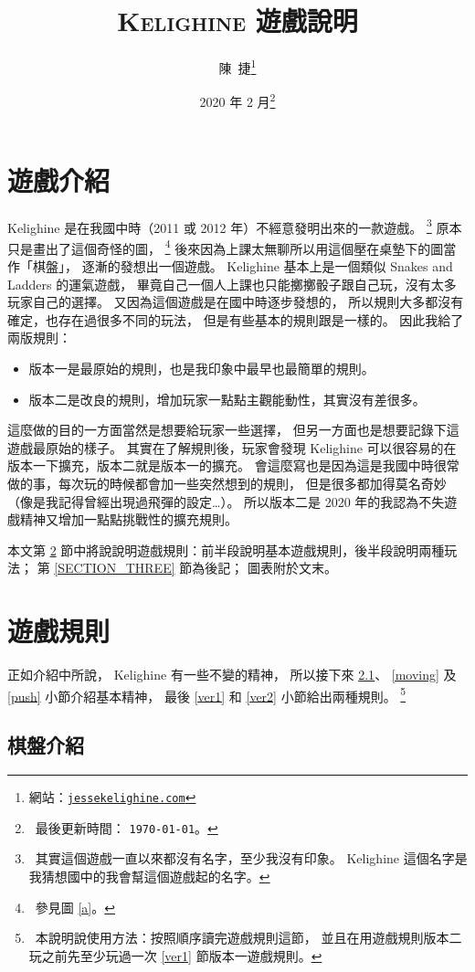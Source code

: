 \documentclass[11pt,a4paper]{article}
\title{\textsc{Kelighine} 遊戲說明}
\author{陳\ 捷\thanks{網站：\href{https://jessekelighine.com}{\texttt{jessekelighine.com}}}}
\date{2020 年 2 月\thanks{\ 最後更新時間： \texttt{\today}。}}
\begin{document}
\maketitle

\section{遊戲介紹} %

Kelighine 是在我國中時（2011 或 2012 年）不經意發明出來的一款遊戲。
	\footnote{\ 其實這個遊戲一直以來都沒有名字，至少我沒有印象。
	Kelighine 這個名字是我猜想國中的我會幫這個遊戲起的名字。}
原本只是畫出了這個奇怪的圖，
	\footnote{\ 參見圖 \ref{a}。}
後來因為上課太無聊所以用這個壓在桌墊下的圖當作「棋盤」，
逐漸的發想出一個遊戲。
Kelighine 基本上是一個類似 Snakes and Ladders 的運氣遊戲，
畢竟自己一個人上課也只能擲擲骰子跟自己玩，沒有太多玩家自己的選擇。
又因為這個遊戲是在國中時逐步發想的，
所以規則大多都沒有確定，也存在過很多不同的玩法，
但是有些基本的規則跟是一樣的。
因此我給了兩版規則：
\begin{itemize}
	\item 版本一是最原始的規則，也是我印象中最早也最簡單的規則。
	\item 版本二是改良的規則，增加玩家一點點主觀能動性，其實沒有差很多。
\end{itemize}
這麼做的目的一方面當然是想要給玩家一些選擇，
但另一方面也是想要記錄下這遊戲最原始的樣子。
其實在了解規則後，玩家會發現 Kelighine 可以很容易的在版本一下擴充，版本二就是版本一的擴充。
會這麼寫也是因為這是我國中時很常做的事，每次玩的時候都會加一些突然想到的規則，
但是很多都加得莫名奇妙（像是我記得曾經出現過飛彈的設定…）。
所以版本二是 2020 年的我認為不失遊戲精神又增加一點點挑戰性的擴充規則。

本文第 \ref{SECTION_TWO} 節中將說說明遊戲規則：前半段說明基本遊戲規則，後半段說明兩種玩法；
第 \ref{SECTION_THREE} 節為後記；
圖表附於文末。

\section{遊戲規則} \label{SECTION_TWO}%

正如介紹中所說， Kelighine 有一些不變的精神，
所以接下來 \ref{board_intro}、 \ref{moving} 及 \ref{push} 小節介紹基本精神，
最後 \ref{ver1} 和 \ref{ver2} 小節給出兩種規則。
	\footnote{\ 本說明說使用方法：按照順序讀完遊戲規則這節，
	並且在用遊戲規則版本二玩之前先至少玩過一次 \ref{ver1} 節版本一遊戲規則。}

\subsection{棋盤介紹} \label{board_intro} %
\end{document}
